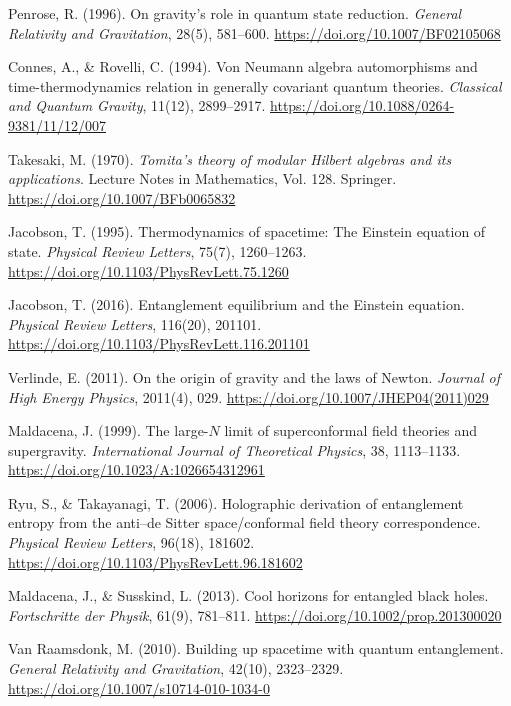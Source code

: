 \documentclass[12pt,a4paper]{article}
\numberwithin{equation}{section}
\begin{document}
\begin{enumerate}[leftmargin=0.5in, itemindent=-0.5in, label={[\arabic*]}]
\item Penrose, R. (1996). On gravity's role in quantum state reduction. \textit{General Relativity and Gravitation}, 28(5), 581--600. \url{https://doi.org/10.1007/BF02105068}

\item Connes, A., \& Rovelli, C. (1994). Von Neumann algebra automorphisms and time-thermodynamics relation in generally covariant quantum theories. \textit{Classical and Quantum Gravity}, 11(12), 2899--2917. \url{https://doi.org/10.1088/0264-9381/11/12/007}

\item Takesaki, M. (1970). \textit{Tomita's theory of modular Hilbert algebras and its applications}. Lecture Notes in Mathematics, Vol. 128. Springer. \url{https://doi.org/10.1007/BFb0065832}

\item Jacobson, T. (1995). Thermodynamics of spacetime: The Einstein equation of state. \textit{Physical Review Letters}, 75(7), 1260--1263. \url{https://doi.org/10.1103/PhysRevLett.75.1260}

\item Jacobson, T. (2016). Entanglement equilibrium and the Einstein equation. \textit{Physical Review Letters}, 116(20), 201101. \url{https://doi.org/10.1103/PhysRevLett.116.201101}

\item Verlinde, E. (2011). On the origin of gravity and the laws of Newton. \textit{Journal of High Energy Physics}, 2011(4), 029. \url{https://doi.org/10.1007/JHEP04(2011)029}

\item Maldacena, J. (1999). The large-$N$ limit of superconformal field theories and supergravity. \textit{International Journal of Theoretical Physics}, 38, 1113--1133. \url{https://doi.org/10.1023/A:1026654312961}

\item Ryu, S., \& Takayanagi, T. (2006). Holographic derivation of entanglement entropy from the anti--de Sitter space/conformal field theory correspondence. \textit{Physical Review Letters}, 96(18), 181602. \url{https://doi.org/10.1103/PhysRevLett.96.181602}

\item Maldacena, J., \& Susskind, L. (2013). Cool horizons for entangled black holes. \textit{Fortschritte der Physik}, 61(9), 781--811. \url{https://doi.org/10.1002/prop.201300020}

\item Van Raamsdonk, M. (2010). Building up spacetime with quantum entanglement. \textit{General Relativity and Gravitation}, 42(10), 2323--2329. \url{https://doi.org/10.1007/s10714-010-1034-0}


\end{enumerate}
\end{document}
